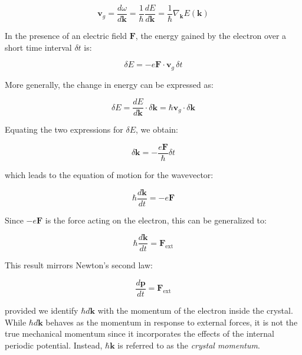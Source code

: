 \begin{equation*}
	\mathbf{v}_g = \frac{d\omega}{d\mathbf{k}} = \frac{1}{\hbar} \frac{dE}{d\mathbf{k}} = \frac{1}{\hbar} \nabla_{\mathbf{k}} E(\mathbf{k})
\end{equation*}

In the presence of an electric field \( \mathbf{F} \), the energy gained by the electron over a short time interval \( \delta t \) is:

\begin{equation*}
	\delta E = -e \mathbf{F} \cdot \mathbf{v}_g \, \delta t
\end{equation*}

\noindent More generally, the change in energy can be expressed as:

\begin{equation*}
	\delta E = \frac{dE}{d\mathbf{k}} \cdot \delta \mathbf{k} = \hbar \mathbf{v}_g \cdot \delta \mathbf{k}
\end{equation*}

\noindent Equating the two expressions for \( \delta E \), we obtain:

\begin{equation*}
	\delta \mathbf{k} = -\frac{e \mathbf{F}}{\hbar} \delta t
\end{equation*}

\noindent which leads to the equation of motion for the wavevector:

\begin{equation*}
	\hbar \frac{d\mathbf{k}}{dt} = -e \mathbf{F}
\end{equation*}

\noindent Since \( -e\mathbf{F} \) is the force acting on the electron, this can be generalized to:

\begin{equation*}
	\hbar \frac{d\mathbf{k}}{dt} = \mathbf{F}_{\text{ext}}
\end{equation*}

\noindent This result mirrors Newton’s second law:

\begin{equation*}
	\frac{d\mathbf{p}}{dt} = \mathbf{F}_{\text{ext}}
\end{equation*}

\noindent provided we identify \( \hbar d\mathbf{k} \) with the momentum of the electron inside the crystal. While \( \hbar d\mathbf{k} \) behaves as the momentum in response to external forces, it is not the true mechanical momentum since it incorporates the effects of the internal periodic potential. Instead, \( \hbar \mathbf{k} \) is referred to as the \textit{crystal momentum}.

